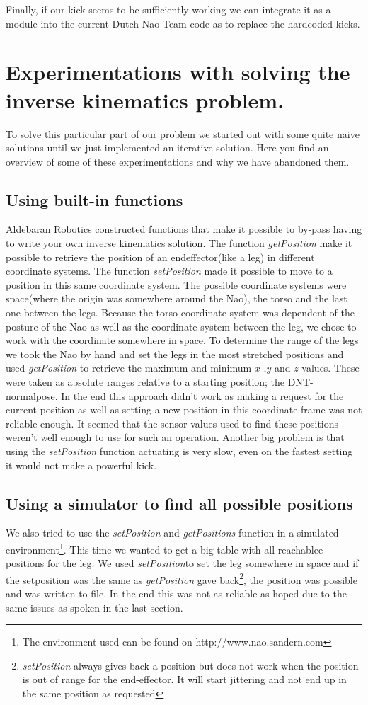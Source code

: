 \documentclass[a4paper]{article}
\begin{document}
Finally, if our kick seems to be sufficiently working we can integrate it as a
module into the current Dutch Nao Team code as to replace the hardcoded kicks.

\appendix
\section{Experimentations with solving the inverse kinematics problem.}
\label{A}
To solve this particular part of our problem we started out with some quite
naive solutions until we just implemented an iterative solution.
Here you find an overview of some of these experimentations and why we have
abandoned them.

\subsection{Using built-in functions}
Aldebaran Robotics constructed functions that make it possible to by-pass having
to write your own inverse kinematics solution. The function \emph{getPosition}
make it possible to retrieve the position of an endeffector(like a leg) in
different coordinate systems. The function  \emph{setPosition} made it possible
to move to a position in this same coordinate system. The possible coordinate
systems were space(where the origin was somewhere around the Nao), the torso
and the last one between the legs. Because the torso coordinate system was
dependent of the posture of the Nao as well as the coordinate system between
the leg, we chose to work with the coordinate somewhere in space.
To determine the range of the legs we took the Nao by hand and set the legs in
the most stretched positions and used \emph{getPosition} to retrieve the
maximum and minimum $x$ ,$y$ and $z$ values.  These were taken as absolute
ranges relative to a starting position; the DNT-normalpose.
In the end this approach didn't work as making a request for the current
position as well as setting a new position in this coordinate frame was not
reliable enough. It seemed that the sensor values used to find these positions
weren't well enough to use for such an operation. Another big problem is that
using the \emph{setPosition} function actuating is very slow, even on the
fastest
setting it would not make a powerful kick.

\subsection{Using a simulator to find all possible positions}
We also tried to use the \emph{setPosition} and \emph{getPositions} function in
a simulated environment\footnote{The environment used can be found on
http://www.nao.sandern.com}. This time we wanted to get a big table with all
reachablee positions for the leg. We used \emph{setPosition}to set the leg
somewhere in space and if the setposition was the same as \emph{getPosition}
gave back\footnote{\emph{setPosition} always gives back a position but does not
work when the position is out of range for the end-effector. It will start
jittering and not end up in the same position as requested}, the position was possible and was written to file.
In the end this was not as reliable as hoped due to the same issues as spoken in
the last section.
\end{document}
